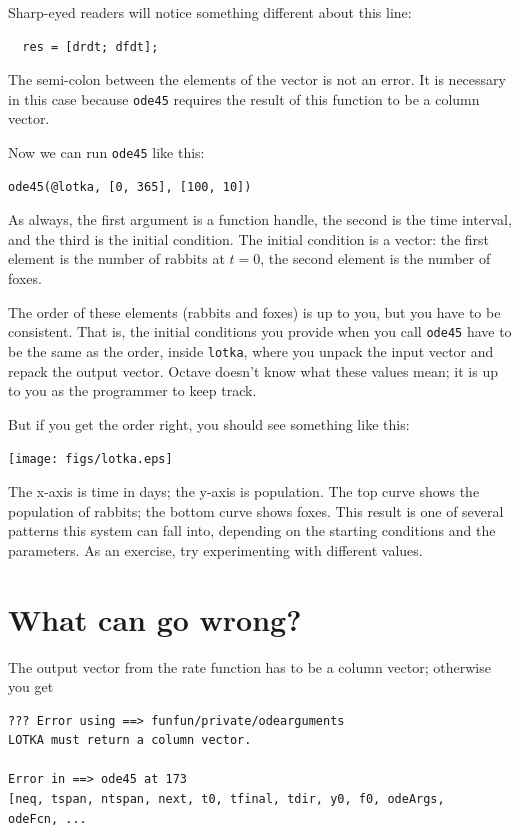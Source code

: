 \documentclass{book}
\begin{document}
Sharp-eyed readers will notice something different about this line:

\begin{verbatim}
  res = [drdt; dfdt];
\end{verbatim}

The semi-colon between the elements of the vector is not an error. It
is necessary in this case because {\tt ode45} requires the result of
this function to be a column vector.

Now we can run {\tt ode45} like this:

\begin{verbatim}
ode45(@lotka, [0, 365], [100, 10])
\end{verbatim}

As always, the first argument is a function handle, the second is the
time interval, and the third is the initial condition. The initial
condition is a vector: the first element is the number of rabbits at
$t=0$, the second element is the number of foxes.

The order of these elements (rabbits and foxes) is up to you, but
you have to be consistent. That is, the initial conditions you
provide when you call {\tt ode45} have to be the same as the order,
inside {\tt lotka}, where you unpack the input vector and repack
the output vector. Octave doesn't know what these values mean;
it is up to you as the programmer to keep track.

But if you get the order right, you should see something like this:

\beforefig \centerline{\texttt{[image: figs/lotka.eps]}}

The x-axis is time in days; the y-axis is population. The top
curve shows the population of rabbits; the bottom curve shows
foxes. This result is one of several patterns
this system can fall into, depending on the starting conditions
and the parameters. As an exercise, try experimenting with
different values.


\section{What can go wrong?}

The output vector from the rate function
has to be a column vector; otherwise you get

\begin{verbatim}
??? Error using ==> funfun/private/odearguments
LOTKA must return a column vector.

Error in ==> ode45 at 173
[neq, tspan, ntspan, next, t0, tfinal, tdir, y0, f0, odeArgs,
odeFcn, ...
\end{verbatim}
\end{document}
